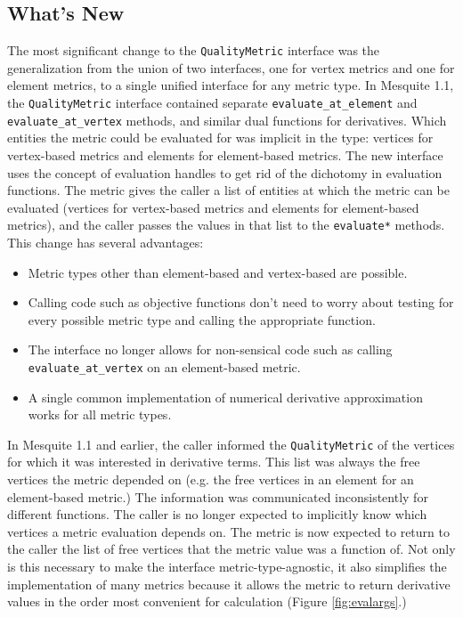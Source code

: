 \documentclass{article}
\begin{document}
\subsection{What's New}

The most significant change to the \texttt{QualityMetric} interface was the generalization from the union of two interfaces, one for vertex metrics and one for element metrics, to a single unified interface for any metric type.  In Mesquite 1.1, the \texttt{QualityMetric} interface contained separate \texttt{evaluate\_at\_element} and \texttt{evaluate\_at\_vertex} methods, and similar dual functions for derivatives.  Which entities the metric could be evaluated for was implicit in the type: vertices for vertex-based metrics and elements for element-based metrics.  The new interface uses the concept of evaluation handles to get rid of the dichotomy in evaluation functions.  The metric gives the caller a list of entities at which the metric can be evaluated (vertices for vertex-based metrics and elements for element-based metrics), and the caller passes the values in that list to the \texttt{evaluate*} methods.  This change has several advantages:
\begin{itemize}
\item Metric types other than element-based and vertex-based are possible.
\item Calling code such as objective functions don't need to worry about testing for every possible metric type and calling the appropriate function.
\item The interface no longer allows for non-sensical code such as calling \texttt{evaluate\_at\_vertex} on an element-based metric.
\item A single common implementation of numerical derivative approximation works for all metric types. 
\end{itemize}

In Mesquite 1.1 and earlier, the caller informed the \texttt{QualityMetric} of the vertices for which it was interested in derivative terms.  This list was always the free vertices the metric depended on (e.g. the free vertices in an element for an element-based metric.)  The information was communicated inconsistently for different functions.  The caller is no longer expected to implicitly know which vertices a metric evaluation depends on.  The metric is now expected to return to the caller the list of free vertices that the metric value was a function of.  Not only is this necessary to make the interface metric-type-agnostic, it also simplifies the implementation of many metrics because it allows the metric to return derivative values in the order most convenient for calculation (Figure \ref{fig:evalargs}.)
\end{document}
